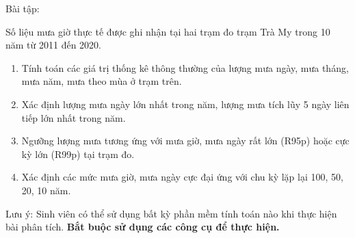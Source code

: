 \noindent Bài tập:

Số liệu mưa giờ thực tế được ghi nhận tại hai trạm đo trạm Trà My trong 10 năm từ 2011 đến 2020.

\begin{enumerate}[label=\arabic*., leftmargin=1.9cm, labelsep=0.4cm]
  \item Tính toán các giá trị thống kê thông thường của lượng mưa ngày, mưa tháng, mưa năm, mưa theo mùa ở trạm trên.
  \item Xác định lượng mưa ngày lớn nhất trong năm, lượng mưa tích lũy 5 ngày liên tiếp lớn nhất trong năm.
  \item Ngưỡng lượng mưa tương ứng với mưa giờ, mưa ngày rất lớn (R95p) hoặc cực kỳ lớn (R99p) tại trạm đo.
  \item Xác định các mức mưa giờ, mưa ngày cực đại ứng với chu kỳ lặp lại 100, 50, 20, 10 năm.
\end{enumerate}

Lưu ý: Sinh viên có thể sử dụng bất kỳ phần mềm tính toán nào khi thực hiện bài phân tích. \textbf{Bắt buộc sử dụng các công cụ để thực hiện.}
